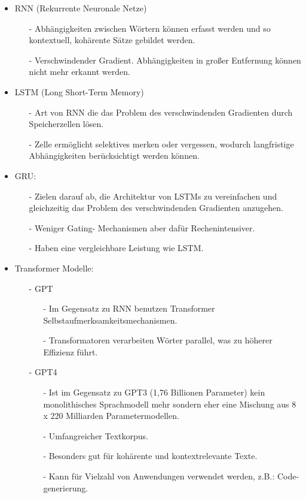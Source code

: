 \documentclass[12pt]{article}
\begin{document}
\begin{itemize}
	\item RNN (Rekurrente Neuronale Netze)
	\begin{itemize}
        \item[-] Abhängigkeiten zwischen Wörtern können erfasst werden und so kontextuell, kohärente Sätze gebildet werden.
        \item[-] Verschwindender Gradient. Abhängigkeiten in großer Entfernung können nicht mehr erkannt werden.
    \end{itemize}
	\item LSTM (Long Short-Term Memory)
	\begin{itemize}
        \item[-] Art von RNN die das Problem des verschwindenden Gradienten durch Speicherzellen lösen.
        \item[-] Zelle ermöglicht selektives merken oder vergessen, wodurch langfristige Abhängigkeiten berücksichtigt werden können.
    \end{itemize}
	\item GRU:
	\begin{itemize}
        \item[-] Zielen darauf ab, die Architektur von LSTMs zu vereinfachen und gleichzeitig das Problem des verschwindenden Gradienten anzugehen.
        \item[-] Weniger Gating- Mechanismen aber dafür Rechenintensiver.
        \item[-] Haben eine vergleichbare Leistung wie LSTM.
    \end{itemize}
	\item Transformer Modelle:
	\begin{itemize}
		\item[-] GPT
		\begin{itemize}
			\item[-] Im Gegensatz zu RNN benutzen Transformer Selbstaufmerksamkeitsmechanismen.
			\item[-] Transformatoren verarbeiten Wörter parallel, was zu höherer Effizienz führt.
		\end{itemize}
        \item[-] GPT4
		\begin{itemize}
			\item[-] Ist im Gegensatz zu GPT3 (1,76 Billionen Parameter) kein monolithisches Sprachmodell mehr sondern eher eine Mischung aus 8 x 220 Milliarden Parametermodellen. 
			\item[-] Umfangreicher Textkorpus.
			\item[-] Besonders gut für kohärente und kontextrelevante Texte.
			\item[-] Kann für Vielzahl von Anwendungen verwendet werden, z.B.: Code-generierung. 
		\end{itemize}
    \end{itemize}
\end{itemize}
\end{document}
